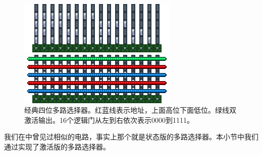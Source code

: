 \begin{figure}[!ht]
\centering
\includegraphics{images/419.png}\vspace{16pt}

\includegraphics{images/420.png}
\caption{经典四位多路选择器。红蓝线表示地址，上面高位下面低位。绿线双激活输出。16个逻辑门从左到右依次表示0000到1111。}\label{fig42}
\end{figure}

我们在中曾见过相似的电路，事实上那个就是状态版的多路选择器。本小节中我们通过实现了激活版的多路选择器。

